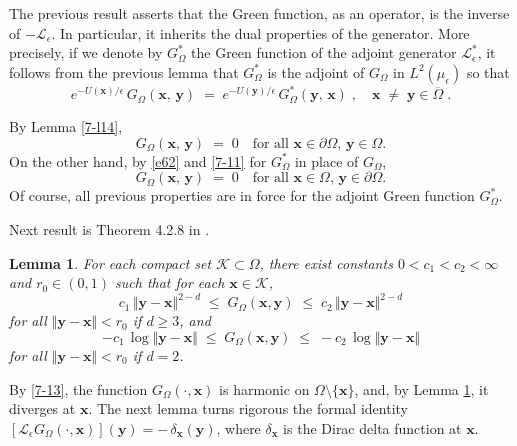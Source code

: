 \documentclass[reqno]{amsart}
\newtheorem{lemma}[theorem]{Lemma}
\newcounter{as}[section]
\newcommand{\mc}[1]{{\mathcal #1}}
\newcommand{\bs}[1]{{\boldsymbol #1}}
\newcommand{\<}{\langle}
\renewcommand{\>}{\rangle}
\begin{document}
The previous result asserts that the Green function, as an operator, is
the inverse of $-\mc L_\epsilon$. In particular, it inherits the dual
properties of the generator. More precisely, if we denote by
$G_{\Omega}^{*}$ the Green function of the adjoint generator
$\mathcal{L}_{\epsilon}^{*}$, it follows from the previous lemma that
$G_{\Omega}^{*}$ is the adjoint of $G_{\Omega}$ in $L^2(\mu_\epsilon)$
so that
\begin{equation}
\label{e62}
e^{-U(\bs{x})/\epsilon} \, G_{\Omega}(\bs{x},\,\bs{y})
\;=\;
e^{-U(\bs{y})/\epsilon} \,G_{\Omega}^{*}(\bs{y},\,\bs{x})\;,
\quad \bs x\; \not = \; \bs y\in\overline{\Omega}\;.
\end{equation}

By Lemma \ref{7-l14},
\begin{equation}
\label{7-11}
G_{\Omega}(\bs{x},\,\bs{y})\;=\; 0 \quad \text{for all $\bs
  x\in\partial\Omega$, $\bs y\in\Omega$.}
\end{equation}
On the other hand, by \eqref{e62} and \eqref{7-11} for $G_{\Omega}^*$ in place
of $G_{\Omega}$,
\begin{equation}
\label{7-12}
G_{\Omega}(\bs{x},\,\bs{y})\;=\; 0 \quad \text{for all $\bs
  x\in\Omega$, $\bs y\in\partial\Omega$.}
\end{equation}
Of course, all previous properties are in force for the adjoint Green
function $G_{\Omega}^*$.

Next result is Theorem 4.2.8 in \cite{p95}.
\begin{lemma}
\label{7-l5}
For each compact set $\mc K \subset \Omega$, there exist constants
$0<c_1<c_2<\infty$ and $r_0 \in (0,1)$ such that for each $\bs x\in
\mc K$,
\begin{equation*}
c_1\, \Vert \bs y-\bs x\Vert^{2-d} \;\le\; G_{\Omega}(\bs x, \bs y)
\;\le\; c_2\, \Vert \bs y-\bs x\Vert^{2-d}
\end{equation*}
for all $\Vert \bs y-\bs x\Vert < r_0$ if $d\ge 3$, and
\begin{equation*}
- c_1\, \log \Vert \bs y-\bs x\Vert \;\le\; G_{\Omega}(\bs x, \bs y)
\;\le\; - c_2\, \log \Vert \bs y-\bs x\Vert
\end{equation*}
for all $\Vert \bs y-\bs x\Vert < r_0$ if $d=2$.
\end{lemma}

By \eqref{7-13}, the function $G_\Omega(\cdot, \bs x)$ is harmonic on
$\Omega\setminus\{\bs x\}$, and, by Lemma \ref{7-l5}, it diverges at $\bs
x$.  The next lemma turns rigorous the formal identity $[\mc
L_\epsilon G_\Omega(\cdot, \bs x)](\bs y) = -\, \delta_{\bs x}(\bs
y)$, where $\delta_{\bs x}$ is the Dirac delta function at $\bs x$.
\end{document}
